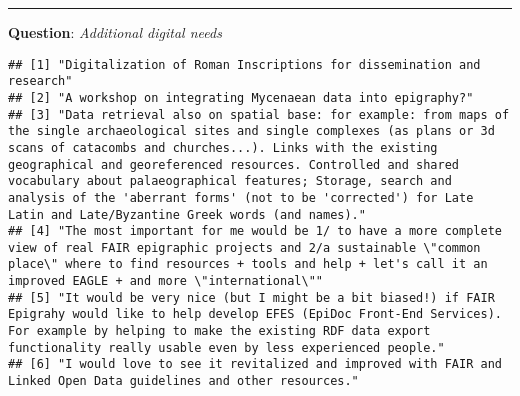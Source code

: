 \documentclass[
]{article}
\begin{document}
\begin{center}\rule{0.5\linewidth}{0.5pt}\end{center}

\textbf{Question}: \emph{Additional digital needs}

\begin{verbatim}
## [1] "Digitalization of Roman Inscriptions for dissemination and research"                                                                                                                                                                                                                                                                                                                                                                                
## [2] "A workshop on integrating Mycenaean data into epigraphy?"                                                                                                                                                                                                                                                                                                                                                                                           
## [3] "Data retrieval also on spatial base: for example: from maps of the single archaeological sites and single complexes (as plans or 3d scans of catacombs and churches...). Links with the existing geographical and georeferenced resources. Controlled and shared vocabulary about palaeographical features; Storage, search and analysis of the 'aberrant forms' (not to be 'corrected') for Late Latin and Late/Byzantine Greek words (and names)."
## [4] "The most important for me would be 1/ to have a more complete view of real FAIR epigraphic projects and 2/a sustainable \"common place\" where to find resources + tools and help + let's call it an improved EAGLE + and more \"international\""                                                                                                                                                                                                   
## [5] "It would be very nice (but I might be a bit biased!) if FAIR Epigrahy would like to help develop EFES (EpiDoc Front-End Services). For example by helping to make the existing RDF data export functionality really usable even by less experienced people."                                                                                                                                                                                        
## [6] "I would love to see it revitalized and improved with FAIR and Linked Open Data guidelines and other resources."                                                                                                                                                                                                                                                                                                                                     

\end{verbatim}
\end{document}
